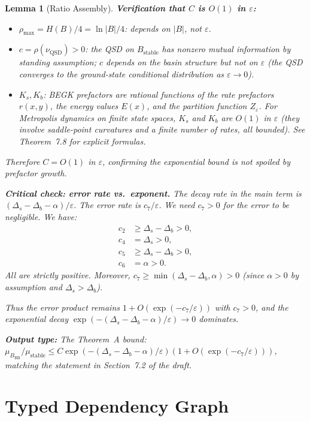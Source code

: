 \documentclass[11pt]{article}
\newtheorem{lemma}{Lemma}
\newcommand{\eps}{\varepsilon}
\newcommand{\Ds}{\Delta_s}
\newcommand{\Db}{\Delta_b}
\newcommand{\Bstable}{B_{\mathrm{stable}}}
\newcommand{\BBB}{B_{\mathrm{BB}}}
\newcommand{\QSD}{\mathrm{QSD}}
\begin{document}
\begin{lemma}[Ratio Assembly]
\medskip
\textbf{Verification that $C$ is $O(1)$ in $\eps$:}
\begin{itemize}
\item $\rho_{\max} = H(B)/4 = \ln|B|/4$: depends on $|B|$, not $\eps$.
\item $c = \rho(\nu_\QSD) > 0$: the QSD on $\Bstable$ has nonzero
  mutual information by standing assumption; $c$ depends on the
  basin structure but not on $\eps$ (the QSD converges to the
  ground-state conditional distribution as $\eps \to 0$).
\item $K_s, K_b$: BEGK prefactors are rational functions of the
  rate prefactors $r(x,y)$, the energy values $E(x)$, and the
  partition function $Z_\eps$. For Metropolis dynamics on finite
  state spaces, $K_s$ and $K_b$ are $O(1)$ in $\eps$ (they involve
  saddle-point curvatures and a finite number of rates, all bounded).
  See \cite{BdH15} Theorem~7.8 for explicit formulas.
\end{itemize}
Therefore $C = O(1)$ in $\eps$, confirming the exponential bound
is not spoiled by prefactor growth.

\medskip
\textbf{Critical check: error rate vs.\ exponent.}
The decay rate in the main term is $(\Ds - \Db - \alpha)/\eps$.
The error rate is $c_7/\eps$. We need $c_7 > 0$ for the error to
be negligible. We have:
\begin{align*}
  c_2 &\geq \Ds - \Db > 0, \\
  c_4 &= \Ds > 0, \\
  c_5 &\geq \Ds - \Db > 0, \\
  c_6 &= \alpha > 0.
\end{align*}
All are strictly positive. Moreover,
$c_7 \geq \min(\Ds - \Db, \alpha) > 0$
(since $\alpha > 0$ by assumption and $\Ds > \Db$).

Thus the error product remains $1 + O(\exp(-c_7/\eps))$ with
$c_7 > 0$, and the exponential decay $\exp(-(\Ds - \Db - \alpha)/\eps)
\to 0$ dominates.

\medskip
\textbf{Output type:}
The Theorem~A bound:
$\mu_\BBB / \mu_{\mathrm{stable}} \leq C \exp(-(\Ds - \Db - \alpha)/\eps)
(1 + O(\exp(-c_7/\eps)))$,
matching the statement in Section~7.2 of the draft.
\end{lemma}

\section{Typed Dependency Graph}
\label{sec:dependency-graph}
\end{document}
